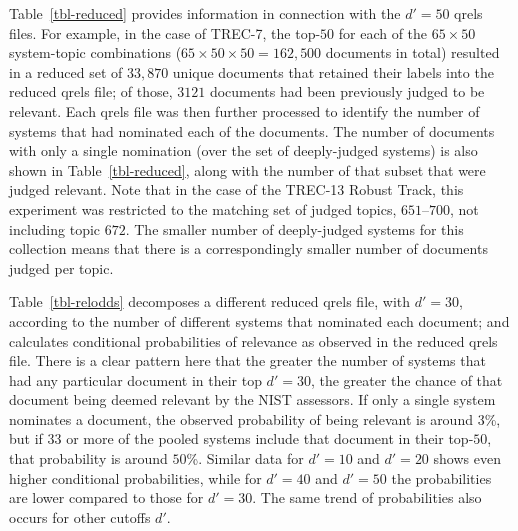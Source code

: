 Table~\ref{tbl-reduced} provides information in connection with
the $d'=50$ qrels files.
For example, in the case of TREC-7, the top-$50$ for each of the
$65\times50$ system-topic combinations
($65\times50\times50=162{,}500$ documents in total) resulted in a
reduced set of $33{,}870$ unique documents that retained their labels
into the reduced qrels file; of those, $3121$ documents had been
previously judged to be relevant.
Each qrels file was then further processed to identify the number of
systems that had nominated each of the documents.
The number of documents with only a single nomination (over the set
of deeply-judged systems) is also shown in Table~\ref{tbl-reduced},
along with the number of that subset that were judged relevant.
Note that in the case of the TREC-13 Robust Track, this experiment
was restricted to the matching set of judged topics, $651$--$700$,
not including topic $672$.
The smaller number of deeply-judged systems for this collection means
that there is a correspondingly smaller number of documents judged
per topic.

\begin{table}[t]
\centering

\aftertabspace
\end{table}

Table~\ref{tbl-relodds} decomposes a different reduced qrels file,
with $d'=30$, according to the number of different systems
that nominated each document; and calculates conditional
probabilities of relevance as observed in the reduced qrels file.
There is a clear pattern here that the greater the number of systems
that had any particular document in their top $d'=30$, the greater
the chance of that document being deemed relevant by the NIST
assessors.
If only a single system nominates a document, the observed
probability of being relevant is around $3$\%, but if $33$ or more of
the pooled systems include that document in their top-$50$, that
probability is around $50$\%.
Similar data for $d'=10$ and $d'=20$ shows even higher conditional
probabilities, while for $d'=40$ and $d'=50$ the probabilities are
lower compared to those for $d'=30$.
The same trend of probabilities also occurs for other cutoffs $d'$.

